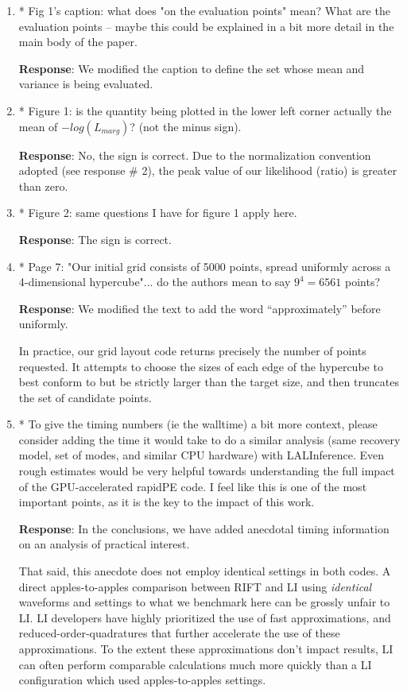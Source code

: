 \documentclass[onecolumn]{revtex4}
\begin{document}
\begin{enumerate}
\item * Fig 1's caption: what does "on the evaluation points" mean? What are
the evaluation points -- maybe this could be explained in a bit more
detail in the main body of the paper.

\noindent \textbf{Response}: We modified the caption to define the set whose mean and variance is being evaluated. 

\item * Figure 1: is the quantity being plotted in the lower left corner
actually the mean of $-log(L_{marg})$? (not the minus sign).

\noindent \textbf{Response}: No, the sign is correct.  Due to the normalization convention adopted (see response \# 2), the peak value
of our likelihood (ratio) is greater than zero.

\item * Figure 2: same questions I have for figure 1 apply here.

\noindent \textbf{Response}: The sign is correct.

\item * Page 7: "Our initial grid consists of 5000 points, spread uniformly
across a 4-dimensional hypercube"... do the authors mean to say $9^4 =
6561$ points?

\noindent \textbf{Response}: We modified the text to add the word ``approximately'' before uniformly.

In practice, our grid layout code returns precisely the number of points requested.  It attempts to choose the sizes of
each edge of the hypercube to best conform to but be strictly larger than the target size, and then truncates the set of
candidate points.  

\item * To give the timing numbers (ie the walltime) a bit more context,
please consider adding the time it would take to do a similar analysis
(same recovery model, set of modes, and similar CPU hardware) with
LALInference. Even rough estimates would be very helpful towards
understanding the full impact of the GPU-accelerated rapidPE code. I
feel like this is one of the most important points, as it is the key
to the impact of this work.

\noindent \textbf{Response}:  In the conclusions, we  have added anecdotal  timing
information on an analysis of practical interest.

That said, this anecdote does not employ identical settings in both codes.  A direct apples-to-apples comparison between RIFT and LI using \emph{identical} waveforms and settings to
what we benchmark here can be grossly unfair to LI.  LI developers
have highly prioritized the use of fast approximations, and reduced-order-quadratures that further accelerate the use of
these approximations.     To the extent these approximations don't impact results, LI can often perform comparable
calculations much more quickly than a LI configuration which used apples-to-apples settings.


\end{enumerate}
\end{document}
